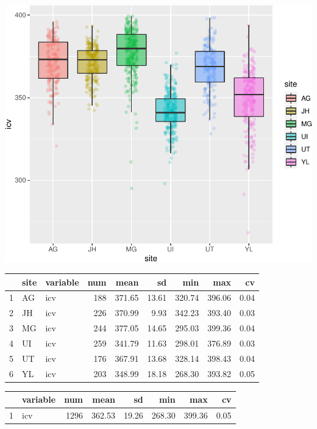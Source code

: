 \documentclass[
]{article}
\begin{document}
\begin{center}\includegraphics{paper_files/figure-latex/plot_icv-1} \end{center}

\begin{table}[ht]
\centering
\begin{tabular}{rllrrrrrr}
  \hline
 & site & variable & num & mean & sd & min & max & cv \\ 
  \hline
1 & AG & icv & 188 & 371.65 & 13.61 & 320.74 & 396.06 & 0.04 \\ 
  2 & JH & icv & 226 & 370.99 & 9.93 & 342.23 & 393.40 & 0.03 \\ 
  3 & MG & icv & 244 & 377.05 & 14.65 & 295.03 & 399.36 & 0.04 \\ 
  4 & UI & icv & 259 & 341.79 & 11.63 & 298.01 & 376.89 & 0.03 \\ 
  5 & UT & icv & 176 & 367.91 & 13.68 & 328.14 & 398.43 & 0.04 \\ 
  6 & YL & icv & 203 & 348.99 & 18.18 & 268.30 & 393.82 & 0.05 \\ 
   \hline
\end{tabular}
\end{table}
\begin{table}[ht]
\centering
\begin{tabular}{rlrrrrrr}
  \hline
 & variable & num & mean & sd & min & max & cv \\ 
  \hline
1 & icv & 1296 & 362.53 & 19.26 & 268.30 & 399.36 & 0.05 \\ 
   \hline
\end{tabular}
\end{table}
\end{document}
